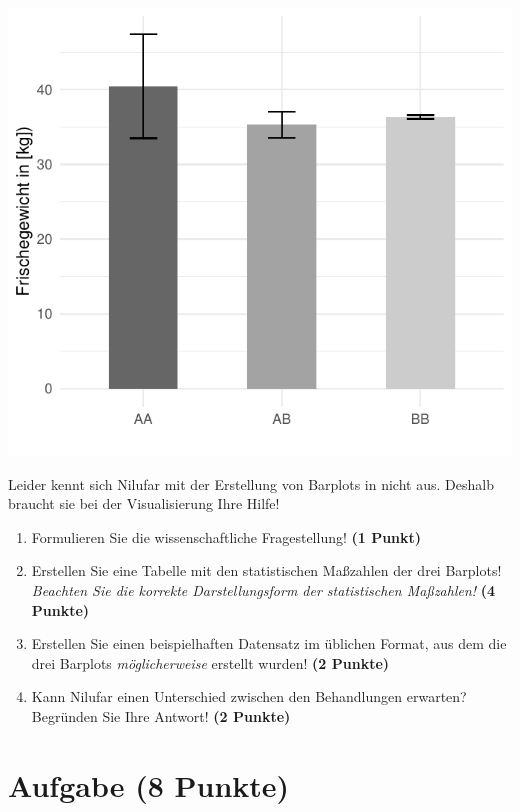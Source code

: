 \documentclass[a4paper, 9pt]{scrartcl}\usepackage[]{graphicx}\usepackage[]{xcolor}
\makeatletter
\def\maxwidth{ %
  \ifdim\Gin@nat@width>\linewidth
    \linewidth
  \else
    \Gin@nat@width
  \fi
}
\makeatother
\begin{document}
{\centering \includegraphics[width=\maxwidth]{img/barplot-02-1} 

}




Leider kennt sich Nilufar mit der Erstellung von Barplots in \Rlogo nicht aus. Deshalb braucht sie bei der Visualisierung Ihre Hilfe!

\begin{enumerate}
\item Formulieren Sie die wissenschaftliche Fragestellung! \textbf{(1 Punkt)}
\item Erstellen Sie eine Tabelle mit den statistischen Maßzahlen der drei Barplots! \textit{Beachten Sie die korrekte Darstellungsform der statistischen Maßzahlen!} \textbf{(4 Punkte)}
\item Erstellen Sie einen beispielhaften Datensatz im \Rlogo üblichen Format, aus dem die drei Barplots \textit{möglicherweise} erstellt wurden! \textbf{(2 Punkte)}
\item Kann Nilufar einen Unterschied zwischen den Behandlungen erwarten? Begründen Sie Ihre Antwort! \textbf{(2 Punkte)}
\end{enumerate} 
\clearpage

\section{Aufgabe \hfill (8 Punkte)}
\end{document}
